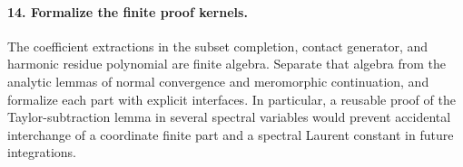 \paragraph{14. Formalize the finite proof kernels.}
The coefficient extractions in the subset completion, contact
generator, and harmonic residue polynomial are finite algebra.
Separate that algebra from the analytic lemmas of normal
convergence and meromorphic continuation, and formalize each part
with explicit interfaces. In particular, a reusable proof of the
Taylor-subtraction lemma in several spectral variables would
prevent accidental interchange of a coordinate finite part and a
spectral Laurent constant in future integrations.
